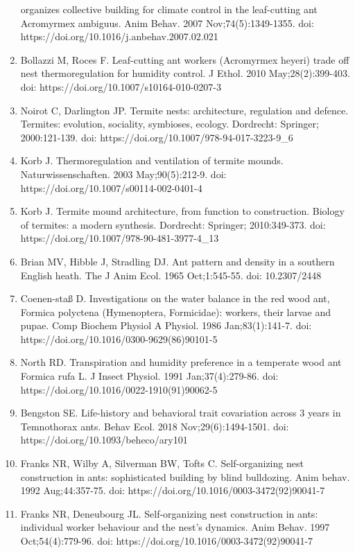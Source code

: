 \documentclass[3p]{elsarticle} %
\begin{document}
\begin{enumerate}
  organizes collective building for climate control in the leaf-cutting
  ant Acromyrmex ambiguus. Anim Behav. 2007 Nov;74(5):1349-1355. doi:
  https://doi.org/10.1016/j.anbehav.2007.02.021
\item
  Bollazzi M, Roces F. Leaf-cutting ant workers (Acromyrmex heyeri)
  trade off nest thermoregulation for humidity control. J Ethol. 2010
  May;28(2):399-403. doi: https://doi.org/10.1007/s10164-010-0207-3
\item
  Noirot C, Darlington JP. Termite nests: architecture, regulation and
  defence. Termites: evolution, sociality, symbioses, ecology.
  Dordrecht: Springer; 2000:121-139. doi:
  https://doi.org/10.1007/978-94-017-3223-9\_6
\item
  Korb J. Thermoregulation and ventilation of termite mounds.
  Naturwissenschaften. 2003 May;90(5):212-9. doi:
  https://doi.org/10.1007/s00114-002-0401-4
\item
  Korb J. Termite mound architecture, from function to construction.
  Biology of termites: a modern synthesis. Dordrecht: Springer;
  2010:349-373. doi: https://doi.org/10.1007/978-90-481-3977-4\_13
\item
  Brian MV, Hibble J, Stradling DJ. Ant pattern and density in a
  southern English heath. The J Anim Ecol. 1965 Oct;1:545-55. doi:
  10.2307/2448
\item
  Coenen-staß D. Investigations on the water balance in the red wood
  ant, Formica polyctena (Hymenoptera, Formicidae): workers, their
  larvae and pupae. Comp Biochem Physiol A Physiol. 1986
  Jan;83(1):141-7. doi: https://doi.org/10.1016/0300-9629(86)90101-5
\item
  North RD. Transpiration and humidity preference in a temperate wood
  ant Formica rufa L. J Insect Physiol. 1991 Jan;37(4):279-86. doi:
  https://doi.org/10.1016/0022-1910(91)90062-5
\item
  Bengston SE. Life-history and behavioral trait covariation across 3
  years in Temnothorax ants. Behav Ecol. 2018 Nov;29(6):1494-1501. doi:
  https://doi.org/10.1093/beheco/ary101
\item
  Franks NR, Wilby A, Silverman BW, Tofts C. Self-organizing nest
  construction in ants: sophisticated building by blind bulldozing. Anim
  behav. 1992 Aug;44:357-75. doi:
  https://doi.org/10.1016/0003-3472(92)90041-7
\item
  Franks NR, Deneubourg JL. Self-organizing nest construction in ants:
  individual worker behaviour and the nest's dynamics. Anim Behav. 1997
  Oct;54(4):779-96. doi: https://doi.org/10.1016/0003-3472(92)90041-7

\end{enumerate}
\end{document}
